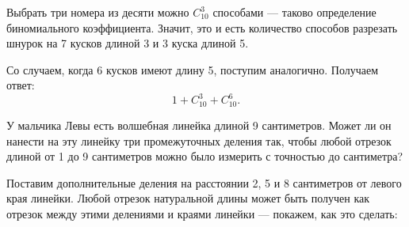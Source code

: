 \begin{itemize}
	Выбрать три номера из десяти можно $C_{10}^3$ способами — таково определение биномиального коэффициента. Значит, это и есть количество способов разрезать шнурок на 7 кусков длиной \SI{3}{} и 3 куска длиной \SI{5}{}.
	
	Со случаем, когда 6 кусков имеют длину 5, поступим аналогично. Получаем ответ:
	$$1 + C_{10}^3 + C_{10}^6.$$
	
	\itC У мальчика Левы есть волшебная линейка длиной 9 сантиметров. Может ли он нанести на эту линейку три промежуточных деления так, чтобы любой отрезок длиной от 1 до 9 сантиметров можно было измерить с точностью до сантиметра?
	
	\itr Поставим дополнительные деления на расстоянии 2, 5 и 8 сантиметров от левого края линейки. Любой отрезок натуральной длины может быть получен как отрезок между этими делениями и краями линейки — покажем, как это сделать:

	

\end{itemize}


